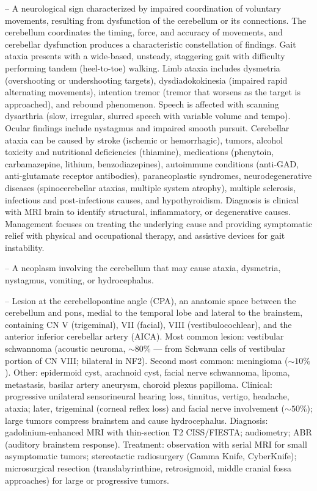 -- A neurological sign characterized by impaired coordination of voluntary movements, resulting from dysfunction of the cerebellum or its connections. The cerebellum coordinates the timing, force, and accuracy of movements, and cerebellar dysfunction produces a characteristic constellation of findings. Gait ataxia presents with a wide-based, unsteady, staggering gait with difficulty performing tandem (heel-to-toe) walking. Limb ataxia includes dysmetria (overshooting or undershooting targets), dysdiadokokinesia (impaired rapid alternating movements), intention tremor (tremor that worsens as the target is approached), and rebound phenomenon. Speech is affected with scanning dysarthria (slow, irregular, slurred speech with variable volume and tempo). Ocular findings include nystagmus and impaired smooth pursuit. Cerebellar ataxia can be caused by stroke (ischemic or hemorrhagic), tumors, alcohol toxicity and nutritional deficiencies (thiamine), medications (phenytoin, carbamazepine, lithium, benzodiazepines), autoimmune conditions (anti-GAD, anti-glutamate receptor antibodies), paraneoplastic syndromes, neurodegenerative diseases (spinocerebellar ataxias, multiple system atrophy), multiple sclerosis, infectious and post-infectious causes, and hypothyroidism. Diagnosis is clinical with MRI brain to identify structural, inflammatory, or degenerative causes. Management focuses on treating the underlying cause and providing symptomatic relief with physical and occupational therapy, and assistive devices for gait instability.

-- A neoplasm involving the cerebellum that may cause ataxia, dysmetria, nystagmus, vomiting, or hydrocephalus.

-- Lesion at the cerebellopontine angle (CPA), an anatomic space between the cerebellum and pons, medial to the temporal lobe and lateral to the brainstem, containing CN V (trigeminal), VII (facial), VIII (vestibulocochlear), and the anterior inferior cerebellar artery (AICA). Most common lesion: vestibular schwannoma (acoustic neuroma, $\sim 80\%$ — from Schwann cells of vestibular portion of CN VIII; bilateral in NF2). Second most common: meningioma ($\sim 10\%$). Other: epidermoid cyst, arachnoid cyst, facial nerve schwannoma, lipoma, metastasis, basilar artery aneurysm, choroid plexus papilloma. Clinical: progressive unilateral sensorineural hearing loss, tinnitus, vertigo, headache, ataxia; later, trigeminal (corneal reflex loss) and facial nerve involvement ($\sim 50\%$); large tumors compress brainstem and cause hydrocephalus. Diagnosis: gadolinium-enhanced MRI with thin-section T2 CISS/FIESTA; audiometry; ABR (auditory brainstem response). Treatment: observation with serial MRI for small asymptomatic tumors; stereotactic radiosurgery (Gamma Knife, CyberKnife); microsurgical resection (translabyrinthine, retrosigmoid, middle cranial fossa approaches) for large or progressive tumors.

